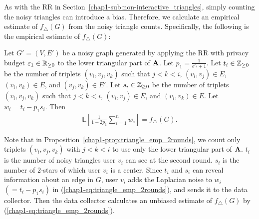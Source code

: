 As with the RR in Section~\ref{chap1-sub:non-interactive_triangles}, simply counting the noisy triangles can introduce a bias. 
Therefore, we calculate an empirical estimate of $f_\triangle(G)$ from the noisy triangle counts. 
Specifically, 
the following is the empirical estimate of $f_\triangle(G)$: 

\begin{proposition}\label{chap1-prop:triangle_emp_2rounds}
  Let $G'=(V,E')$ be a noisy graph generated by applying the RR with privacy budget $\varepsilon_1 \in \mathbb{R}_{\ge0}$   to the lower triangular part of $\mathbf{A}$.
  Let $p_1 = \frac{1}{e^{\epsilon_1}+1}$. 
  Let $t_i \in \mathbb{Z}_{\ge0}$ be the number of triplets $(v_i, v_j, v_k)$ such that 
  $j < k < i$, 
  $(v_i,v_j) \in E$, $(v_i,v_k) \in E$, and $(v_j,v_k) \in E'$.
  Let $s_i \in \mathbb{Z}_{\ge0}$ be the number of triplets $(v_i, v_j, v_k)$ such that 
  $j < k < i$, 
  $(v_i,v_j) \in E$, and $(v_i,v_k) \in E$. 
  Let $w_i = t_i - p_1 s _i$. 
  Then 
  \begin{align}
      \textstyle{\mathbb{E}\left[ \frac{1}{1-2p_1} \sum_{i=1}^n w_i \right] = f_\triangle(G).}
      \label{chap1-eq:triangle_emp_2rounds}
  \end{align}
\end{proposition}

Note that in Proposition~\ref{chap1-prop:triangle_emp_2rounds}, 
we count only triplets $(v_i, v_j, v_k)$ with 
$j < k < i$ 
to use only the lower triangular part of $\mathbf{A}$. 
$t_i$ is the number of noisy triangles user $v_i$ can see at the second round. 
$s_i$ is the number of $2$-stars of which user $v_i$ is a center. 
Since $t_i$ and $s_i$ can reveal information about an edge in $G$, user $v_i$ adds the Laplacian noise to $w_i$ $(= t_i - p_1 s _i)$ in (\ref{chap1-eq:triangle_emp_2rounds}), and sends it to the data collector. 
Then the data collector calculates an unbiased estimate of $f_\triangle(G)$ by (\ref{chap1-eq:triangle_emp_2rounds}). 

